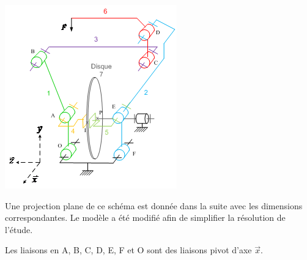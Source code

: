 \begin{center}
 \includegraphics[width=0.4\linewidth]{img/fig18}
\end{center}

Une projection plane de ce schéma est donnée dans la suite avec les dimensions correspondantes. Le modèle a été modifié afin de simplifier la résolution de l'étude.

Les liaisons en A, B, C, D, E, F et O sont des liaisons pivot d'axe $\overrightarrow{x}$.

